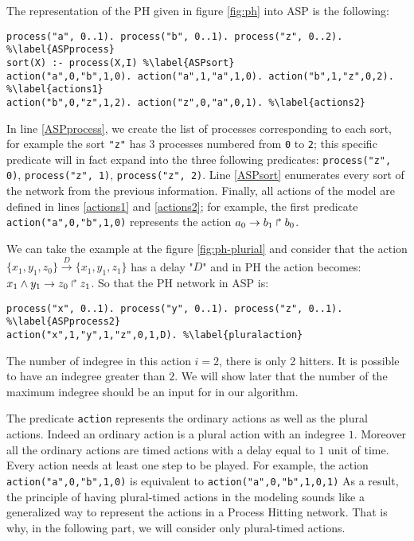 \begin{example}
\label{ex1:asp-ph}
The representation of the PH given in figure \ref{fig:ph} into ASP is the following:
\begin{lstlisting}
process("a", 0..1). process("b", 0..1). process("z", 0..2). %\label{ASPprocess}
sort(X) :- process(X,I) %\label{ASPsort}
action("a",0,"b",1,0). action("a",1,"a",1,0). action("b",1,"z",0,2). %\label{actions1}
action("b",0,"z",1,2). action("z",0,"a",0,1). %\label{actions2}
\end{lstlisting}
In line \ref{ASPprocess}, we create the list of processes corresponding to each sort,
for example the sort \texttt{"z"} has 3 processes numbered from \texttt{0} to \texttt{2};
this specific predicate will in fact expand into the three following predicates:
\texttt{process("z", 0)}, \texttt{process("z", 1)}, \texttt{process("z", 2)}.
Line \ref{ASPsort} enumerates every sort of the network from the previous information.
Finally, all actions of the model are defined in lines \ref{actions1} and \ref{actions2};
for example, the first predicate \texttt{action("a",0,"b",1,0)} represents the action
$a_0\rightarrow b_1\Rsh b_0$.
\end{example}

\begin{example}
\label{ex2:ph-asp}
We can take the example at the figure \ref{fig:ph-plurial} and consider that the action  $\{x_1, y_1, z_0 \} \xrightarrow{D} \{x_1, y_1, z_1 \} $  has a delay "$D$" and in PH the action becomes: $x_1 \wedge y_1\rightarrow z_0\Rsh z_1$. So that the PH  network in ASP is:
\begin{lstlisting}
process("x", 0..1). process("y", 0..1). process("z", 0..1). %\label{ASPprocess2}
action("x",1,"y",1,"z",0,1,D). %\label{pluralaction}
\end{lstlisting}
The number of indegree in this action $i=2$, there is only 2 hitters. It is possible to have an indegree greater than $2$. We will show later that the number of the maximum indegree should be an input for in our algorithm.
\end{example}

The predicate \texttt{action} represents the ordinary actions as well as the plural actions. Indeed an ordinary action is a plural action with an indegree $1$. Moreover all the ordinary actions are timed actions with a delay equal to $1$ unit of time. Every action needs at least one step to be played. For example, the action \texttt{action("a",0,"b",1,0)} is equivalent to \texttt{action("a",0,"b",1,0,1)}
As a result, the principle of having plural-timed actions in the modeling sounds like a generalized way to represent the actions in a Process Hitting network. That is why, in the following part, we will consider only plural-timed actions. 
	